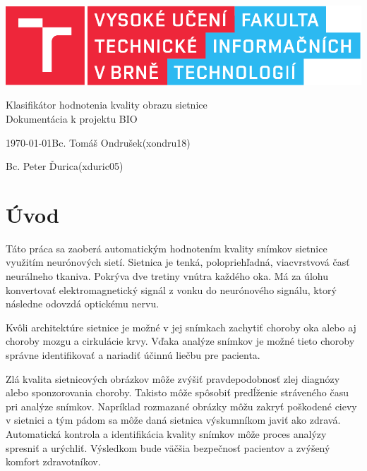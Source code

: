 \documentclass[a4paper, 11pt]{article}
\begin{document}
\begin{titlepage}
    \begin{center}
        \includegraphics{fit.pdf}
        
        \Huge{Klasifikátor hodnotenia kvality obrazu sietnice} \\
        \LARGE{Dokumentácia k projektu BIO}
    \end{center}
        {\Large \today \hfill Bc. Tomáš Ondrušek(xondru18)} \\
    
    \begin{FlushRight}
        \Large Bc. Peter Ďurica(xduric05)
    \end{FlushRight}
\end{titlepage}

\tableofcontents
\pagebreak

\section{Úvod}
Táto práca sa zaoberá automatickým hodnotením kvality snímkov sietnice využitím neurónových sietí. Sietnica \cite{OCY_veducko} je tenká, polopriehľadná, viacvrstvová časť neurálneho tkaniva. Pokrýva dve tretiny vnútra každého oka. Má za úlohu konvertovať elektromagnetický signál z vonku do neurónového signálu, ktorý následne odovzdá optickému nervu.

Kvôli architektúre sietnice \cite{RetImag} je možné v jej snímkach zachytiť choroby oka alebo aj choroby mozgu a cirkulácie krvy. Vďaka analýze snímkov je možné tieto choroby správne identifikovať a nariadiť účinnú liečbu pre pacienta.

Zlá kvalita sietnicových obrázkov \cite{OCY_veducko} môže zvýšiť pravdepodobnosť zlej diagnózy alebo sponzorovania choroby. Takisto môže spôsobiť predĺženie stráveného času pri analýze snímkov. Napríklad rozmazané obrázky môžu zakryť poškodené cievy v sietnici a tým pádom sa môže daná sietnica výskumníkom javiť ako zdravá. Automatická kontrola a identifikácia kvality snímkov môže proces analýzy spresniť a urýchliť. Výsledkom bude väčšia bezpečnosť pacientov a zvýšený komfort zdravotníkov.
\end{document}
